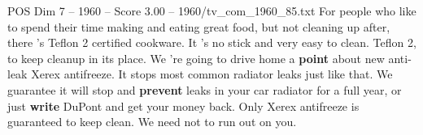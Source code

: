 \begin{textsample}{POS Dim 7 – 1960 – Score 3.00 – 1960/tv\_com\_1960\_85.txt}  \label{ex:f7_pos_024}
For people who like to spend their time making and eating great food, but not cleaning up after, there 's Teflon 2 certified cookware.
It 's no stick and very easy to clean.
Teflon 2, to keep cleanup in its place.
We 're going to drive home a \textbf{point} about new anti-leak Xerex antifreeze.
It stops most common radiator leaks just like that.
We guarantee it will stop and \textbf{prevent} leaks in your car radiator for a full year, or just \textbf{write} DuPont and get your money back.
Only Xerex antifreeze is guaranteed to keep clean.
We need not to run out on you.

\end{textsample}
